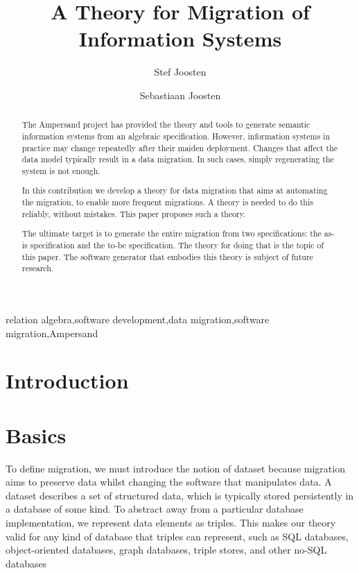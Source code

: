 \documentclass{elsarticle}
\begin{document}


\title{A Theory for Migration of Information Systems}
\author[ou,ordina]{Stef Joosten}
\author[umn]{Sebastiaan Joosten}
\address[ou]{Open Universiteit Nederland, Heerlen, the Netherlands}
\address[ordina]{Ordina NV, Nieuwegein, the Netherlands}
\address[umn]{University of Minnesota, Minneapolis, USA}

\begin{abstract}
	The Ampersand project has provided the theory and tools to generate semantic information systems from an algebraic specification.
	However, information systems in practice may change repeatedly after their maiden deployment.
	Changes that affect the data model typically result in a data migration.
	In such cases, simply regenerating the system is not enough.

	In this contribution we develop a theory for data migration that aims at automating the migration,
	to enable more frequent migrations.
	A theory is needed to do this reliably, without mistakes.
	This paper proposes such a theory.

	The ultimate target is to generate the entire migration from two specifications: the as-is specification and the to-be specification.
	The theory for doing that is the topic of this paper.
	The software generator that embodies this theory is subject of future research.
\end{abstract}

\begin{keyword}
relation algebra\sep software development\sep data migration\sep software migration\sep Ampersand
\end{keyword}
\maketitle

\section{Introduction}
\label{sct:Introduction}

\section{Basics}
\label{sct:Basics}
	To define migration, we must introduce the notion of dataset because migration aims to preserve data whilst changing the software that manipulates data.
	A dataset describes a set of structured data, which is typically stored persistently in a database of some kind.
	To abstract away from a particular database implementation,
	we represent data elements as triples.
	This makes our theory valid for any kind of database that triples can represent,
	such as SQL databases, object-oriented databases, graph databases, triple stores, and other no-SQL databases
\end{document}
